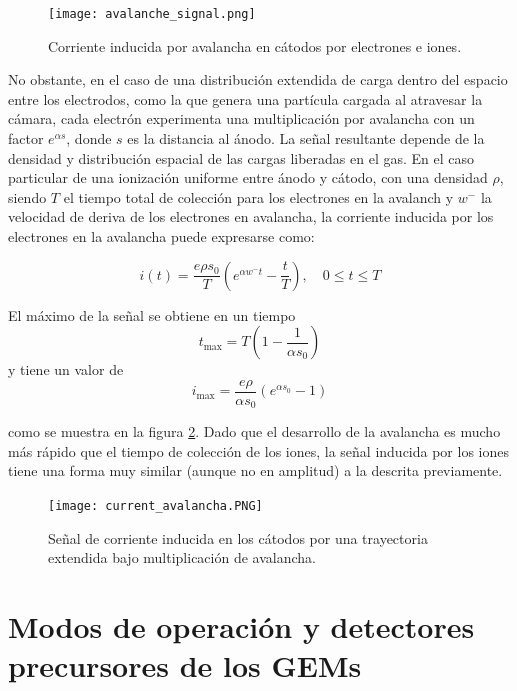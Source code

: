 \documentclass[]{book}
\begin{document}
\begin{figure}[H]
    \centering
    \texttt{[image: avalanche\_signal.png]}
    \caption{Corriente inducida por avalancha en cátodos por electrones e iones.}
    \label{fig:avalanche_signal}
\end{figure}

\noindent No obstante, en el caso de una distribución extendida de carga dentro del espacio entre los electrodos, como la que genera una partícula cargada al atravesar la cámara, cada electrón experimenta una multiplicación por avalancha con un factor \( e^{\alpha s} \), donde \( s \) es la distancia al ánodo. La señal resultante depende de la densidad y distribución espacial de las cargas liberadas en el gas. En el caso particular de una ionización uniforme entre ánodo y cátodo, con una densidad \( \rho \), siendo $T$ el tiempo total de colección para los electrones en la avalanch y $w^-$ la velocidad de deriva de los electrones en avalancha, la corriente inducida por los electrones en la avalancha puede expresarse como:

\begin{equation}
i(t) = \frac{e \rho s_0}{T} \left( e^{\alpha w^- t} - \frac{t}{T} \right), \quad 0 \leq t \leq T
\end{equation}

El máximo de la señal se obtiene en un tiempo 
\begin{equation}
t_{\text{max}} = T \left( 1 - \frac{1}{\alpha s_0} \right)
\end{equation}
y tiene un valor de 
\begin{equation}
i_{\text{max}} = \frac{e \rho}{\alpha s_0} \left( e^{\alpha s_0} - 1 \right)
\end{equation}

\noindent como se muestra en la figura \ref{fig:current_avalancha}. Dado que el desarrollo de la avalancha es mucho más rápido que el tiempo de colección de los iones, la señal inducida por los iones tiene una forma muy similar (aunque no en amplitud) a la descrita previamente.

\begin{figure}[H]
    \centering
    \texttt{[image: current\_avalancha.PNG]}
    \caption{Señal de corriente inducida en los cátodos por una trayectoria extendida bajo multiplicación de avalancha.}
    \label{fig:current_avalancha}
\end{figure}

\section{Modos de operación y detectores precursores de los GEMs}
\end{document}

